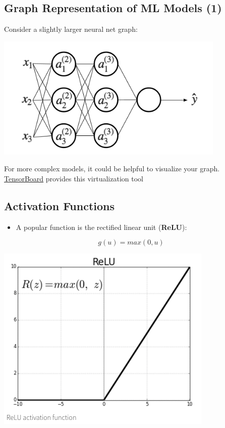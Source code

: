\documentclass[11pt]{article}
\begin{document}
\subsection*{Graph Representation of ML Models (1)}
\label{sec:orgc184643}
Consider a slightly larger neural net graph:
\begin{center}
\includegraphics[width=.9\linewidth]{images/neural_net.png}
\end{center}

For more complex models, it could be helpful to visualize your graph.
\href{https://www.tensorflow.org/versions/r0.7/how\_tos/graph\_viz/index.html}{TensorBoard} provides this virtualization tool
\subsection*{Activation Functions}
\label{sec:org2106bdf}
\begin{itemize}
\item A popular function is the rectified linear unit (\textbf{ReLU}):
\end{itemize}
$$g(u) = max(0, u)$$

\begin{center}
\begin{center}
\includegraphics[width=.9\linewidth]{images/relu.png}
\end{center}
\end{center}
\end{document}

